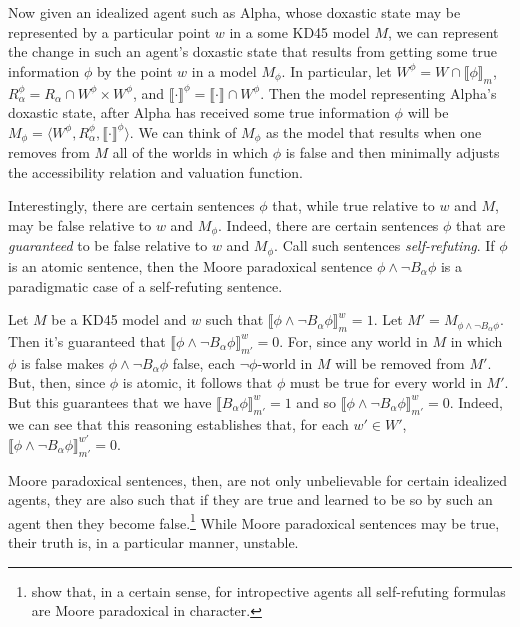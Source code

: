Now given an idealized agent such as Alpha, whose doxastic state may be represented by a particular point $w$ in a some KD45 model $M$, we can represent the change in such an agent's doxastic state that results from getting some true information $\phi$ by the point $w$ in a model $M_\phi$.
In particular, let $W^\phi = W \cap \llbracket \phi \rrbracket_m$, $R_\alpha^\phi = R_\alpha \cap W^\phi \times W^\phi$, and $\llbracket \cdot \rrbracket^\phi = \llbracket \cdot \rrbracket \cap W^\phi$.
Then the model representing Alpha's doxastic state, after Alpha has received some true information $\phi$ will be $M_\phi = \langle W^\phi, R_\alpha^\phi, \llbracket \cdot \rrbracket^\phi \rangle$.
We can think of $M_\phi$ as the model that results when one removes from $M$ all of the worlds in which $\phi$ is false and then minimally adjusts the accessibility relation and valuation function.

Interestingly, there are certain sentences $\phi$ that, while true relative to $w$ and $M$, may be false relative to $w$ and $M_\phi$.
Indeed, there are certain sentences $\phi$ that are \textit{guaranteed} to be false relative to $w$ and $M_\phi$.
Call such sentences \textit{self-refuting}.
If $\phi$ is an atomic sentence, then the Moore paradoxical sentence $\phi \wedge \lnot B_\alpha \phi$ is a paradigmatic case of a self-refuting sentence.


Let $M$ be a KD45 model and $w$ such that $\llbracket \phi \wedge \lnot B_\alpha \phi \rrbracket^w_m = 1$.
Let $M' = M_{\phi \wedge \lnot B_\alpha \phi}$.
Then it's guaranteed that $\llbracket \phi \wedge \lnot B_\alpha \phi \rrbracket^w_{m'}= 0$.
For, since any world in $M$ in which $\phi$ is false makes $\phi \wedge \lnot B_\alpha \phi$ false, each $\lnot \phi$-world in $M$ will be removed from $M'$.
But, then, since $\phi$ is atomic, it follows that $\phi$ must be true for every world in $M'$.
But this guarantees that we have $\llbracket B_\alpha \phi \rrbracket^w_{m'} = 1$ and so $\llbracket \phi \wedge \lnot B_\alpha \phi \rrbracket^w_{m'}= 0$.
Indeed, we can see that this reasoning establishes that, for each $w' \in W'$,  $\llbracket \phi \wedge \lnot B_\alpha \phi \rrbracket^{w'}_{m'}= 0$. 

Moore paradoxical sentences, then, are not only unbelievable for certain idealized agents, they are also such that if they are true and learned to be so by such an agent then they become false.\footnote{\citet{HollidayIcard1} show that, in a certain sense, for intropective agents all self-refuting formulas are Moore paradoxical in character.}
While Moore paradoxical sentences may be true, their truth is, in a particular manner, unstable.

